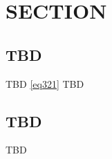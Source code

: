 \documentclass{article} %
\begin{document}
\section{SECTION}
\subsection{TBD}
TBD \eqref{eq321} TBD
\subsection{TBD}
TBD
\end{document}
